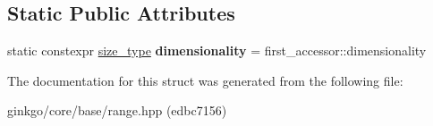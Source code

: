 \subsection*{Static Public Attributes}
\begin{DoxyCompactItemize}
\item 
\mbox{\label{structgko_1_1accessor_1_1mmul__operation_ae8057c37357eae7ea962f11aab54a38e}} 
static constexpr \hyperlink{namespacegko_a6e5c95df0ae4e47aab2f604a22d98ee7}{size\+\_\+type} {\bfseries dimensionality} = first\+\_\+accessor\+::dimensionality
\end{DoxyCompactItemize}


The documentation for this struct was generated from the following file\+:\begin{DoxyCompactItemize}
\item 
ginkgo/core/base/range.\+hpp (edbc7156)\end{DoxyCompactItemize}
